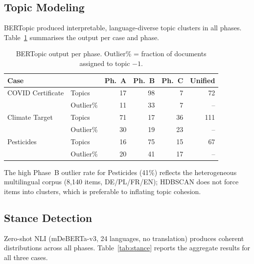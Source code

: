 \documentclass[sigconf,natbib]{acmart}
\begin{document}
\subsection{Topic Modeling}

BERTopic produced interpretable, language-diverse topic clusters in all phases.
Table~\ref{tab:topics} summarises the output per case and phase.

\begin{table}[h]
\centering
\small
\begin{tabular}{llrrrr}
\toprule
\textbf{Case} & & \textbf{Ph.~A} & \textbf{Ph.~B} & \textbf{Ph.~C} & \textbf{Unified} \\
\midrule
COVID Certificate  & Topics   & 17 & 98 & 7  & 72 \\
                   & Outlier\% & 11 & 33 & 7  & -- \\
Climate Target     & Topics   & 71 & 17 & 36 & 111 \\
                   & Outlier\% & 30 & 19 & 23 & -- \\
Pesticides         & Topics   & 16 & 75 & 15 & 67 \\
                   & Outlier\% & 20 & 41 & 17 & -- \\
\bottomrule
\end{tabular}
\caption{BERTopic output per phase. Outlier\% = fraction of documents assigned to topic $-1$.}
\label{tab:topics}
\end{table}

The high Phase~B outlier rate for Pesticides (41\%) reflects the heterogeneous multilingual
corpus (8,140 items, DE/PL/FR/EN); HDBSCAN does not force items into clusters, which is
preferable to inflating topic cohesion.

\subsection{Stance Detection}

Zero-shot NLI (mDeBERTa-v3, 24 languages, no translation) produces coherent distributions
across all phases. Table~\ref{tab:stance} reports the aggregate results for all three cases.
\end{document}
